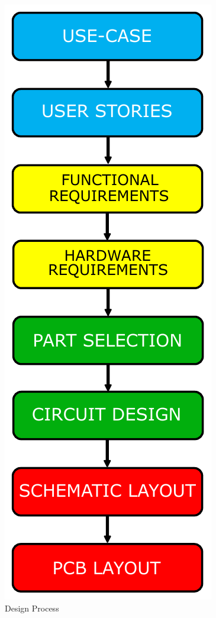 \begin{figure}
	\includegraphics[width=0.5\linewidth]{Figures/first_table.pdf}\centering
	\caption{Design Process}
	\label{fig:methodology}
\end{figure}
